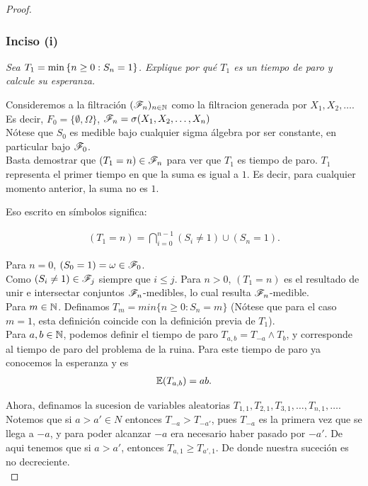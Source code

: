 \begin{proof}
	\subsubsection{Inciso (i)}
	\emph
	{
		Sea $T_1=\min\left\{ n\geq 0:S_n=1\right\} $. Explique por qu\'e $T_1$ es un 
		tiempo de paro y calcule su esperanza.\\
	}
	
		Consideremos a la filtración $(\mathscr{F}_n)_{n\in\mathbb{N}}$ como la filtracion 
		generada por $X_1, X_2, \dots$.\\

		Es decir, $F_0 = \{\emptyset, \Omega\}$, $\mathscr{F}_n = \sigma(X_1, X_2, \dots, X_n)$\\
	
		Nótese que $S_0$ es medible bajo cualquier sigma álgebra por ser constante, en particular bajo
		$\mathscr{F}_0$.\\
	
		Basta demostrar que $(T_1 = n) \in \mathscr{F}_n$ para ver que $T_1$ es tiempo de paro. $T_1$ 
		representa el primer tiempo en que la suma es igual a $1$. Es decir, para cualquier 
		momento anterior, la suma no es $1$.
	
		Eso escrito en símbolos significa:
	
		\begin{align}
			(T_1 = n) = \bigcap_{i=0}^{n-1}(S_i \not= 1) \cup (S_n = 1).
		\end{align}
	
		Para $n=0$, $(S_0 = 1) = \omega \in \mathscr{F}_0$. \\
	
		Como $(S_i \not= 1) \in \mathscr{F}_j$ siempre que $i \leq j$. Para $n>0$, $(T_1 = n)$ es el resultado de 
		unir e intersectar conjuntos $\mathscr{F}_n$-medibles, lo cual resulta $\mathscr{F}_n$-medible.\\
	
		Para $m \in \mathbb{N}$. Definamos $T_m = min\{n \geq 0 : S_n = m\}$ 
		(Nótese que para el caso $m=1$, esta definición	coincide con la definición previa de $T_1$).\\
		
		Para $a,b \in \mathbb{N}$, podemos definir el tiempo de paro $T_{a,b} = T_{-a} \wedge T_b$, y 
		corresponde al 	tiempo de paro del problema de la ruina. Para este tiempo de paro ya conocemos 
		la esperanza y es
		\begin{align}
			\mathbb{E}(T_{a,b}) = ab.
		\end{align}
		
		Ahora, definamos la sucesion de variables aleatorias $T_{1,1}, T_{2,1}, T_{3,1}, \dots, T_{n,1}, 
		\dots$. Notemos que si $a>a' \in N$ entonces $T_{-a} > T_{-a'}$, pues $T_{-a}$ es la primera vez
		que se llega a $-a$, y para poder alcanzar $-a$ era necesario haber pasado por $-a'$.
		De aqui tenemos que si $a>a'$, entonces $T_{a,1} \geq T_{a',1}$. De donde nuestra suceción es 
		no decreciente.\\
		

\end{proof}
